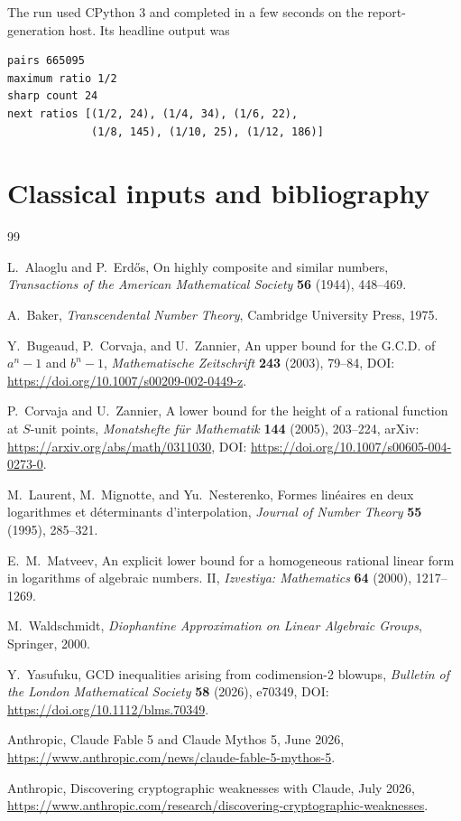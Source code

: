 \documentclass[11pt,oneside]{article}
\theoremstyle{definition}
\theoremstyle{remark}
\begin{document}
The run used CPython 3 and completed in a few seconds on the report-generation host.  Its
headline output was
\begin{verbatim}
pairs 665095
maximum ratio 1/2
sharp count 24
next ratios [(1/2, 24), (1/4, 34), (1/6, 22),
             (1/8, 145), (1/10, 25), (1/12, 186)]
\end{verbatim}

\section{Classical inputs and bibliography}
\label{app:bib}

\begin{thebibliography}{99}

L.~Alaoglu and P.~Erd\H{o}s,
\newblock On highly composite and similar numbers,
\newblock \emph{Transactions of the American Mathematical Society} \textbf{56} (1944),
448--469.

A.~Baker,
\newblock \emph{Transcendental Number Theory},
\newblock Cambridge University Press, 1975.

Y.~Bugeaud, P.~Corvaja, and U.~Zannier,
\newblock An upper bound for the G.C.D. of $a^n-1$ and $b^n-1$,
\newblock \emph{Mathematische Zeitschrift} \textbf{243} (2003), 79--84,
\newblock DOI: \url{https://doi.org/10.1007/s00209-002-0449-z}.

P.~Corvaja and U.~Zannier,
\newblock A lower bound for the height of a rational function at $S$-unit points,
\newblock \emph{Monatshefte f\"ur Mathematik} \textbf{144} (2005), 203--224,
\newblock arXiv: \url{https://arxiv.org/abs/math/0311030},
DOI: \url{https://doi.org/10.1007/s00605-004-0273-0}.

M.~Laurent, M.~Mignotte, and Yu.~Nesterenko,
\newblock Formes lin\'eaires en deux logarithmes et d\'eterminants d'interpolation,
\newblock \emph{Journal of Number Theory} \textbf{55} (1995), 285--321.

E.~M.~Matveev,
\newblock An explicit lower bound for a homogeneous rational linear form in logarithms of
algebraic numbers. II,
\newblock \emph{Izvestiya: Mathematics} \textbf{64} (2000), 1217--1269.

M.~Waldschmidt,
\newblock \emph{Diophantine Approximation on Linear Algebraic Groups},
\newblock Springer, 2000.

Y.~Yasufuku,
\newblock GCD inequalities arising from codimension-2 blowups,
\newblock \emph{Bulletin of the London Mathematical Society} \textbf{58} (2026), e70349,
\newblock DOI: \url{https://doi.org/10.1112/blms.70349}.

Anthropic,
\newblock Claude Fable 5 and Claude Mythos 5,
 June 2026,
\newblock \url{https://www.anthropic.com/news/claude-fable-5-mythos-5}.

Anthropic,
\newblock Discovering cryptographic weaknesses with Claude,
 July 2026,
\newblock \url{https://www.anthropic.com/research/discovering-cryptographic-weaknesses}.

\end{thebibliography}
\end{document}
